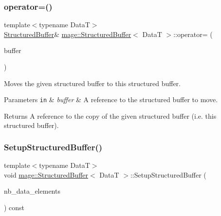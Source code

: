 \subsubsection{\texorpdfstring{operator=()}{operator=()}\hspace{0.1cm}{\footnotesize\ttfamily [2/2]}}
{\footnotesize\ttfamily template$<$typename DataT$>$ \\
\hyperlink{structmage_1_1_structured_buffer}{Structured\+Buffer}\& \hyperlink{structmage_1_1_structured_buffer}{mage\+::\+Structured\+Buffer}$<$ DataT $>$\+::operator= (\begin{DoxyParamCaption}\item[{\hyperlink{structmage_1_1_structured_buffer}{Structured\+Buffer}$<$ DataT $>$ \&\&}]{buffer }\end{DoxyParamCaption})\hspace{0.3cm}{\ttfamily [delete]}}

Moves the given structured buffer to this structured buffer.


\begin{DoxyParams}[1]{Parameters}
\mbox{\tt in}  & {\em buffer} & A reference to the structured buffer to move. \\
\hline
\end{DoxyParams}
\begin{DoxyReturn}{Returns}
A reference to the copy of the given structured buffer (i.\+e. this structured buffer). 
\end{DoxyReturn}
\hypertarget{structmage_1_1_structured_buffer_a569008d501e11d208288022372df2f48}{}\label{structmage_1_1_structured_buffer_a569008d501e11d208288022372df2f48} 
\subsubsection{\texorpdfstring{Setup\+Structured\+Buffer()}{SetupStructuredBuffer()}}
{\footnotesize\ttfamily template$<$typename DataT$>$ \\
void \hyperlink{structmage_1_1_structured_buffer}{mage\+::\+Structured\+Buffer}$<$ DataT $>$\+::Setup\+Structured\+Buffer (\begin{DoxyParamCaption}\item[{size\+\_\+t}]{nb\+\_\+data\+\_\+elements }\end{DoxyParamCaption}) const\hspace{0.3cm}{\ttfamily [private]}}

